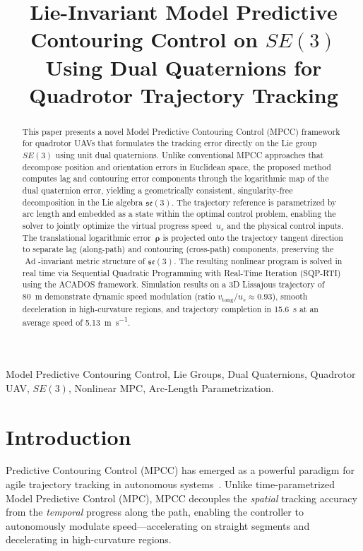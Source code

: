 \documentclass[journal]{IEEEtran}
\newcommand{\se}{\mathfrak{se}(3)}        %
\newcommand{\SE}{SE(3)}                   %
\DeclareMathOperator{\Ad}{Ad}
\begin{document}
\title{Lie-Invariant Model Predictive Contouring Control on $\SE$ Using Dual Quaternions for Quadrotor Trajectory Tracking}

\author{
}

\maketitle

\begin{abstract}
This paper presents a novel Model Predictive Contouring Control (MPCC) framework for quadrotor UAVs that formulates the tracking error directly on the Lie group $\SE$ using unit dual quaternions. Unlike conventional MPCC approaches that decompose position and orientation errors in Euclidean space, the proposed method computes lag and contouring error components through the logarithmic map of the dual quaternion error, yielding a geometrically consistent, singularity-free decomposition in the Lie algebra $\se$. The trajectory reference is parametrized by arc length and embedded as a state within the optimal control problem, enabling the solver to jointly optimize the virtual progress speed~$u_s$ and the physical control inputs. The translational logarithmic error~$\bm{\rho}$ is projected onto the trajectory tangent direction to separate lag (along-path) and contouring (cross-path) components, preserving the $\Ad$-invariant metric structure of $\se$. The resulting nonlinear program is solved in real time via Sequential Quadratic Programming with Real-Time Iteration (SQP-RTI) using the ACADOS framework. Simulation results on a 3D Lissajous trajectory of \SI{80}{\meter} demonstrate dynamic speed modulation (ratio $v_\text{tang}/u_s \approx 0.93$), smooth deceleration in high-curvature regions, and trajectory completion in \SI{15.6}{\second} at an average speed of \SI{5.13}{\meter\per\second}.
\end{abstract}

\begin{IEEEkeywords}
Model Predictive Contouring Control, Lie Groups, Dual Quaternions, Quadrotor UAV, $\SE$, Nonlinear MPC, Arc-Length Parametrization.
\end{IEEEkeywords}

\section{Introduction}
 Predictive Contouring Control (MPCC) has emerged as a powerful paradigm for agile trajectory tracking in autonomous systems~\cite{liniger2015optimization, romero2022model}. Unlike time-parametrized Model Predictive Control (MPC), MPCC decouples the \emph{spatial} tracking accuracy from the \emph{temporal} progress along the path, enabling the controller to autonomously modulate speed—accelerating on straight segments and decelerating in high-curvature regions.
\end{document}
